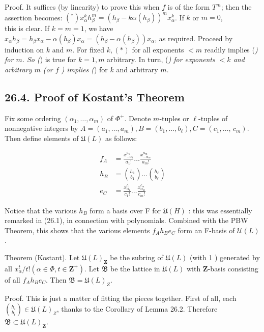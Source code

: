\documentclass[10pt]{article}
\begin{document}
Proof. It suffices (by linearity) to prove this when $f$ is of the form $T^{m}$; then the assertion becomes: $\left({ }^{*}\right) x_{\alpha}^{k} h_{\beta}^{m}=\left(h_{\beta}-k \alpha\left(h_{\beta}\right)\right)^{m} x_{\alpha}^{k}$. If $k$ or $m=0$,\\
this is clear. If $k=m=1$, we have $x_{\alpha} h_{\beta}=h_{\beta} x_{\alpha}-\alpha\left(h_{\beta}\right) x_{\alpha}=\left(h_{\beta}-\alpha\left(h_{\beta}\right)\right) x_{\alpha}$, as required. Proceed by induction on $k$ and $m$. For fixed $k,(*)$ for all exponents $<m$ readily implies (\textit{) for $m$. So (}) is true for $k=1, m$ arbitrary. In turn, (\textit{) for exponents $<k$ and arbitrary $m$ (or $f$ ) implies (}) for $k$ and arbitrary $m$.

\subsection*{26.4. Proof of Kostant's Theorem}
Fix some ordering $\left(\alpha_{1}, \ldots, \alpha_{m}\right)$ of $\Phi^{+}$. Denote $m$-tuples or $\ell$-tuples of nonnegative integers by $A=\left(a_{1}, \ldots, a_{m}\right), B=\left(b_{1}, \ldots, b_{\ell}\right), C=\left(c_{1}, \ldots\right.$, $\left.c_{m}\right)$. Then define elements of $\mathfrak{U}(L)$ as follows:

$$
\begin{aligned}
f_{A} & =\frac{x_{-\alpha_{1}}^{a_{1}}}{a_{1}!} \ldots \frac{x_{-\alpha_{m}}^{a_{m}}}{a_{m}!} \\
h_{B} & =\binom{h_{1}}{b_{1}} \ldots\binom{h_{\ell}}{b_{\ell}} \\
e_{C} & =\frac{x_{\alpha_{1}}^{c_{1}}}{c_{1}!} \ldots \frac{x_{\alpha_{m}}^{c_{m}}}{c_{m}!}
\end{aligned}
$$

Notice that the various $h_{B}$ form a basis over F for $\mathfrak{U}(H)$ : this was essentially remarked in (26.1), in connection with polynomials. Combined with the PBW Theorem, this shows that the various elements $f_{A} h_{B} e_{C}$ form an F-basis of $\mathcal{U}(L)$.

Theorem (Kostant). Let $\mathfrak{U}(L)_{\mathbf{Z}}$ be the subring of $\mathfrak{U}(L)$ (with 1 ) generated by all $x_{\alpha}^{t} / t!\left(\alpha \in \Phi, t \in \mathbf{Z}^{+}\right)$. Let $\mathfrak{B}$ be the lattice in $\mathfrak{U}(L)$ with $\mathbf{Z}$-basis consisting of all $f_{A} h_{B} e_{C}$. Then $\mathfrak{B}=\mathfrak{U}(L)_{Z}$.

Proof. This is just a matter of fitting the pieces together. First of all, each $\binom{h_{i}}{b_{i}} \in \mathfrak{U}(L)_{Z}$, thanks to the Corollary of Lemma 26.2. Therefore $\mathfrak{B} \subset \mathfrak{U}(L)_{\mathbf{Z}}$.
\end{document}
